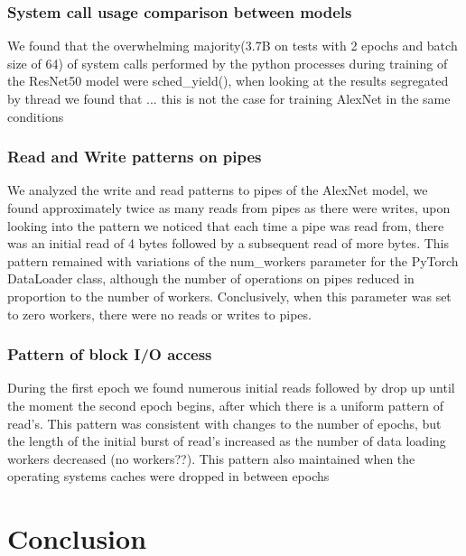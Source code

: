 \documentclass[conference]{IEEEtran}
\begin{document}
\subsubsection{System call usage comparison between models}
We found that the overwhelming majority(3.7B on tests with 2 epochs and batch size of 64) of system calls performed by the python processes during training of the ResNet50 model were sched\_yield(), when looking at the results segregated by thread we found that ... this is not the case for training AlexNet in the same conditions

\subsubsection{Read and Write patterns on pipes}
We analyzed the write and read patterns to pipes of the AlexNet model, we found approximately twice as many reads from pipes as there were writes, upon looking into the pattern we noticed that
each time a pipe was read from, there was an initial read of 4 bytes followed by a subsequent read of more bytes.
This pattern remained with variations of the num\_workers parameter for the PyTorch DataLoader class, although the number of operations on pipes reduced in proportion to the number of workers. Conclusively, when this parameter was set to zero workers, there were no reads or writes to pipes.

\subsubsection{Pattern of block I/O access}
During the first epoch we found numerous initial reads followed by drop up until the moment the second epoch begins, after which there is a uniform pattern of read's.
This pattern was consistent with changes to the number of epochs, but the length of the initial burst of read's increased as the number of data loading workers decreased (no workers??).
This pattern also maintained when the operating systems caches were dropped in between epochs

\section{Conclusion}


\end{document}
